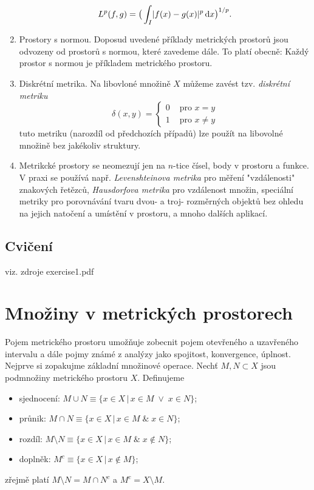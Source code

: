 \begin{enumerate}
        \[
          L^p(f,g)=\big(\int_I \lvert f(x)-g(x)\rvert^p\,{\rm d} x\big)^{1/p}. 
        \]
  \item Prostory s normou. Doposud uvedené příklady metrických prostorů jsou odvozeny od prostorů s normou, které zavedeme dále.
        To platí obecně: Každý prostor s normou je příkladem metrického prostoru.
  \item Diskrétní metrika. Na libovloné množině $X$ můžeme zavést tzv. {\it diskrétní metriku}
  \[
     \delta(x,y)=\left\{
     \begin{aligned}
        0&  \text{ pro }x= y\\
        1&  \text{ pro }x\ne y 
     \end{aligned}
     \right.
  \]
  tuto metriku (narozdíl od předchozích případů) lze použít na libovolné množině bez jakékoliv struktury. 
  \item Metrikcké prostory se neomezují jen na $n$-tice čísel, body v prostoru a funkce. V praxi se používá
   např. {\it Levenshteinova metrika} pro měření "vzdálenosti" znakových řetězců, {\it Hausdorfova metrika} pro 
   vzdálenost množin, speciální metriky pro porovnávání tvaru dvou- a troj- rozměrných objektů bez ohledu na jejich natočení a umístění v prostoru,
  a mnoho dalších aplikací.
\end{enumerate}

\subsection{Cvičení}

viz. zdroje exercise1.pdf

\section{Množiny v metrických prostorech}
Pojem metrického prostoru umožňuje zobecnit pojem otevřeného a uzavřeného intervalu a dále pojmy známé z analýzy
jako spojitost, konvergence, úplnost. Nejprve si zopakujme základní množinové operace.
Nechť $M,N\subset X$ jsou podmnožiny metrického prostoru $X$. Definujeme
\begin{itemize}
   \item sjednocení: $M\cup N\equiv\{x\in X\,|\,x\in M\;\vee\;x\in N\}$;
   \item průnik: $M\cap N\equiv\{x\in X\,|\,x\in M\;\&\;x\in N\}$;
   \item rozdíl: $M\setminus N\equiv\{x\in X\,|\,x\in M\;\&\;x\not\in N\}$;
   \item doplněk: $M^c\equiv\{x\in X\,|\,x\not\in M\}$;
\end{itemize}
zřejmě platí $M\setminus N=M\cap N^c$ a $M^c = X\setminus M$.

